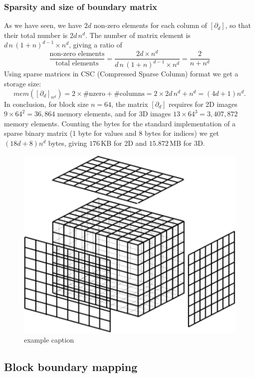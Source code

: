 \documentclass[11pt, oneside]{amsart}   	%
\begin{document}
\subsubsection*{Sparsity and size of boundary matrix }\label{sec:bm-size}

As we have seen, we have $2d$ non-zero elements for each column of $[\partial_d]$, so that their total number is $2d\,n^d$. The number of matrix element is $d\,n\,(1+n)^{d-1} \times n^d$, giving a ratio of 
\[
\frac{\mbox{non-zero\ elements}}{\mbox{total\ elements}} = 
\frac{2d\times n^d}{d\,n\,(1+n)^{d-1} \times n^d} =
\frac{2}{n+n^d}
\]
Using sparse matrices in CSC (Compressed Sparse Column) format we get a storage size:
\[
mem([\partial_d]_{n^d}) = 2\times \#\mbox{nzero} + \#\mbox{columns} = 2\times 2d\,n^d + n^d = (4d+1)n^d.
\]
In conclusion, for block size $n=64$, the matrix $[\partial_d]$ requires for 2D images $9\times 64^2=36,864$ memory elements, and for 3D images $13\times 64^3=3,407,872$ memory elements. Counting the bytes for the standard implementation of a sparse binary matrix (1 byte for values and 8 bytes for indices) we get $(18d+8)n^d$ bytes, giving $176$\,KB for 2D and $15.872$\,MB for 3D.


\begin{figure}[htbp] %
   \centering
   \includegraphics[width=0.4\linewidth]{figs/grid.pdf} 
   \caption{example caption}
   \label{fig:example}
\end{figure}



\subsection{Block boundary mapping}\label{sec:block-mapping}
\end{document}

